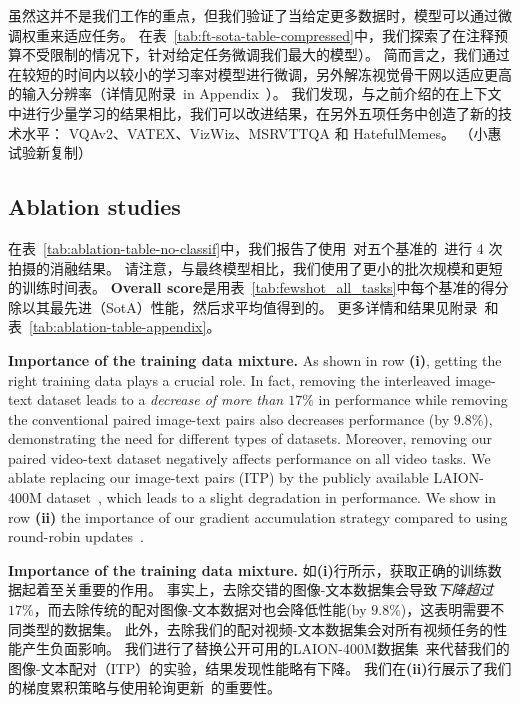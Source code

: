 虽然这并不是我们工作的重点，但我们验证了当给定更多数据时，\method{}模型可以通过微调权重来适应任务。
在表~\ref{tab:ft-sota-table-compressed}中，我们探索了在注释预算不受限制的情况下，针对给定任务微调我们最大的模型\largem{}）。
简而言之，我们通过在较短的时间内以较小的学习率对模型进行微调，另外解冻视觉骨干网以适应更高的输入分辨率（详情见附录~in Appendix~）。
我们发现，与之前介绍的在上下文中进行少量学习的结果相比，我们可以改进结果，在另外五项任务中创造了新的技术水平： VQAv2、VATEX、VizWiz、MSRVTTQA 和 HatefulMemes。
（小惠试验新复制）



\subsection{Ablation studies}
\label{sec:ablations}



在表~\ref{tab:ablation-table-no-classif}中，我们报告了使用\base{}~对五个\dev{}基准的\metadevsubsets~进行 4 次拍摄的消融结果。
请注意，与最终模型相比，我们使用了更小的批次规模和更短的训练时间表。
\textbf{Overall score}是用表~\ref{tab:fewshot_all_tasks}中每个基准的得分除以其最先进（SotA）性能，然后求平均值得到的。
更多详情和结果见附录~和表~\ref{tab:ablation-table-appendix}。

\noindent
\textbf{Importance of the training data mixture.}
As shown in row \textbf{(i)}, getting the right training data plays a crucial role.
In fact, removing the interleaved image-text dataset \mmmw{} leads to a \emph{decrease of more than $17\%$} in performance while removing the conventional paired image-text pairs also decreases performance (by $9.8\%$), demonstrating the need for different types of datasets.
Moreover, removing our paired video-text dataset negatively affects performance on all video tasks.
We ablate replacing our image-text pairs (ITP) by the publicly available LAION-400M dataset~\cite{schuhmann2021laion}, which leads to a slight degradation in performance.
We show in row \textbf{(ii)} the importance of our gradient accumulation strategy compared to using round-robin updates~\citep{cho2021unifying}.

 \textbf{Importance of the training data mixture.}
 如\textbf{(i)}行所示，获取正确的训练数据起着至关重要的作用。 事实上，去除交错的图像-文本数据集\mmmw{}会导致\emph{下降超过$17\%$}，而去除传统的配对图像-文本数据对也会降低性能(by $9.8\%$)，这表明需要不同类型的数据集。
 此外，去除我们的配对视频-文本数据集会对所有视频任务的性能产生负面影响。 
 我们进行了替换公开可用的LAION-400M数据集~\cite{schuhmann2021laion}来代替我们的图像-文本配对（ITP）的实验，结果发现性能略有下降。 我们在\textbf{(ii)}行展示了我们的梯度累积策略与使用轮询更新~\citep{cho2021unifying}的重要性。

